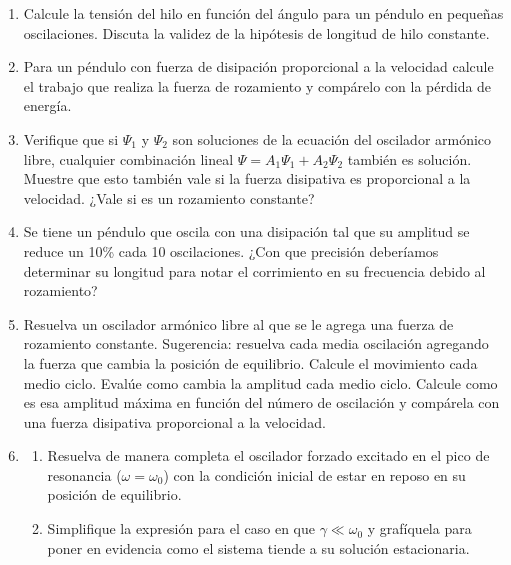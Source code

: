 \documentclass[11pt,spanish,a4paper]{article}
\begin{document}
\begin{enumerate}
\item Calcule la tensión del hilo en función del ángulo para un péndulo en pequeñas
	oscilaciones. Discuta la validez de la hipótesis de longitud de hilo constante.


\item Para un péndulo con fuerza de disipación proporcional a la velocidad calcule el
	trabajo que realiza la fuerza de rozamiento y compárelo con la pérdida de energía.


\item Verifique que si \(\Psi_1\) y \(\Psi_2\) son soluciones de la ecuación del oscilador armónico libre, cualquier combinación lineal \(\Psi= A_1 \Psi_1+ A_2 \Psi_2 \) también es solución.
	Muestre que esto también vale si la fuerza disipativa es proporcional a la velocidad.
	¿Vale si es un rozamiento constante?


\item Se tiene un péndulo que oscila con una disipación tal que su amplitud se reduce un 10\% cada 10 oscilaciones.
	¿Con que precisión deberíamos determinar su longitud para notar el corrimiento en su frecuencia debido al rozamiento?


\item Resuelva un oscilador armónico libre al que se le agrega una fuerza de rozamiento constante.
	Sugerencia: resuelva cada media oscilación agregando la fuerza que cambia la
	posición de equilibrio.
	Calcule el movimiento cada medio ciclo.
	Evalúe como cambia la amplitud cada medio ciclo.
	Calcule como es esa amplitud máxima en función del número de oscilación y compárela con una fuerza disipativa proporcional a la velocidad.


\item
	\begin{enumerate}
		\item Resuelva de manera completa el oscilador forzado excitado en el pico de resonancia (\(\omega =\omega_0 \)) con la condición inicial de estar en reposo en su posición de equilibrio.

	\item Simplifique la expresión para el caso en que \(\gamma \ll \omega_0\) y grafíquela para poner en evidencia como el sistema tiende a su solución estacionaria.
	\end{enumerate}

\end{enumerate}
\end{document}

